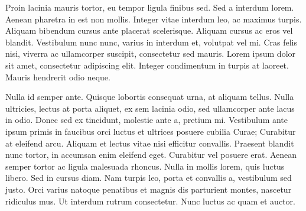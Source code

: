 \documentclass[a0,landscape]{a0poster}
\begin{document}
\begin{multicols*}{3}
  Proin lacinia mauris tortor, eu tempor ligula finibus sed. Sed a interdum lorem. Aenean pharetra in est non mollis. Integer vitae interdum leo, ac maximus turpis. Aliquam bibendum cursus ante placerat scelerisque. Aliquam cursus ac eros vel blandit. Vestibulum nunc nunc, varius in interdum et, volutpat vel mi. Cras felis nisi, viverra ac ullamcorper suscipit, consectetur sed mauris. Lorem ipsum dolor sit amet, consectetur adipiscing elit. Integer condimentum in turpis at laoreet. Mauris hendrerit odio neque.

  Nulla id semper ante. Quisque lobortis consequat urna, at aliquam tellus. Nulla ultricies, lectus at porta aliquet, ex sem lacinia odio, sed ullamcorper ante lacus in odio. Donec sed ex tincidunt, molestie ante a, pretium mi. Vestibulum ante ipsum primis in faucibus orci luctus et ultrices posuere cubilia Curae; Curabitur at eleifend arcu. Aliquam et lectus vitae nisi efficitur convallis. Praesent blandit nunc tortor, in accumsan enim eleifend eget. Curabitur vel posuere erat. Aenean semper tortor ac ligula malesuada rhoncus. Nulla in mollis lorem, quis luctus libero. Sed in cursus diam. Nam turpis leo, porta et convallis a, vestibulum sed justo. Orci varius natoque penatibus et magnis dis parturient montes, nascetur ridiculus mus. Ut interdum rutrum consectetur. Nunc luctus ac quam et auctor.


\end{multicols*}
\end{document}
